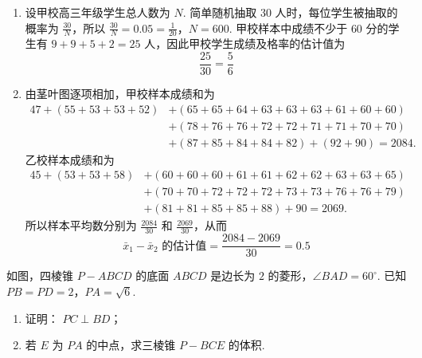 \begin{solution}
\begin{enumerate}
\item 设甲校高三年级学生总人数为 \(N\). 简单随机抽取 \(30\) 人时，每位学生被抽取的概率为 \(\frac{30}{N}\)，所以
\(\frac{30}{N}=0.05=\frac1{20}\)，\(N=600\).
甲校样本中成绩不少于 \(60\) 分的学生有 \(9+9+5+2=25\) 人，因此甲校学生成绩及格率的估计值为
\[
\frac{25}{30}=\frac56
\]

\item 由茎叶图逐项相加，甲校样本成绩和为
\[
\begin{aligned}
47+(55+53+53+52)&+(65+65+64+63+63+63+61+60+60)\\
&+(78+76+76+72+72+71+71+70+70)\\
&+(87+85+84+84+82)+(92+90)=2084.
\end{aligned}
\]
乙校样本成绩和为
\[
\begin{aligned}
45+(53+53+58)&+(60+60+60+61+61+62+62+63+63+65)\\
&+(70+70+72+72+72+73+73+76+76+79)\\
&+(81+81+85+85+88)+90=2069.
\end{aligned}
\]
所以样本平均数分别为 \(\frac{2084}{30}\) 和 \(\frac{2069}{30}\)，从而
\[
\bar{x}_1-\bar{x}_2\text{ 的估计值}=\frac{2084-2069}{30}=0.5
\]
\end{enumerate}
\end{solution}

\begin{problem}
如图，四棱锥 \(P - ABCD\) 的底面 \(ABCD\) 是边长为 \(2\) 的菱形，\(\angle BAD = 60^{\circ}\). 已知 \(PB = PD = 2\)，\(PA = \sqrt{6}\).

\begin{enumerate}
\item 证明： \(PC \perp BD\)；
\item 若 \(E\) 为 \(PA\) 的中点，求三棱锥 \(P - BCE\) 的体积.
\end{enumerate}

\end{problem}

